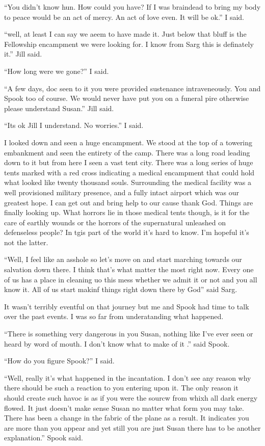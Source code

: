 ``You didn't know hun. How could you have? If I was braindead to bring my body to peace would be an act of mercy. An act of love even. It will be ok.'' I said.

``well, at least I can say we aeem to have made it. Just below that bluff is the Fellowship encampment we were looking for. I know from Sarg this is definately it.'' Jill said.

``How long were we gone?'' I said.

``A few days, doc seen to it you were provided sustenance intraveneously. You and Spook too of course. We would never have put you on a funeral pire otherwise please understand Susan.'' Jill said.

``Its ok Jill I understand. No worries.'' I said.

I looked down and seen a huge encampment. We stood at the top of a towering embankment and seen the entirety of the camp. There was a long road leading down to it but from here I seen a vast tent city. There was a long series of huge tents marked with a red cross indicating a medical encampment that could hold what looked like twenty thousand souls. Surrounding the medical facility was a well provisioned military presence, and a fully intact airport which was our greatest hope. I can get out and bring help to our cause thank God. Things are finally looking up. What horrors lie in those medical tents though, is it for the care of earthly wounds or the horrors of the supernatural unleashed on defenseless people? In tgis part of the world it's hard to know. I'm hopeful it's not the latter.

``Well, I feel like an asshole so let's move on and start marching towards our salvation down there. I think that's what matter the most right now. Every one of us has a place in cleaning uo this mess whether we admit it or not and you all know it. All of us start makinf things right down there by God'' said Sarg.

It wasn't terribly eventful on that journey but me and Spook had time to talk over the past events. I was so far from underatanding what happened.

``There is something very dangerous in you Susan, nothing like I've ever seen or heard by word of mouth. I don't know what to make of it .'' said Spook.

``How do you figure Spook?'' I said.

``Well, really it's what happened in the incantation. I don't see any reason why there should be such a reaction to you entering upon it. The only reason it should create such havoc is as if you were the sourcw from whixh all dark energy flowed. It just doesn't make sense Susan no matter what form you may take. There has been a change in the fabric of the plane as a result. It indicates you are more than you appear and yet still you are just Susan there has to be another explanation.'' Spook said.

